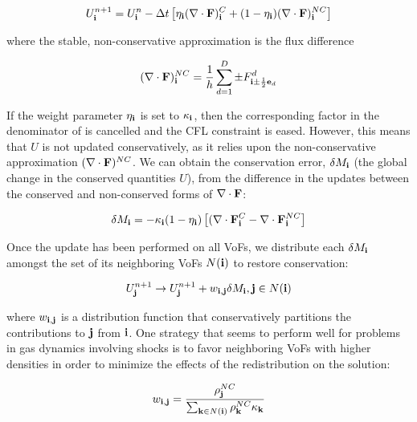 \begin{equation}
U^{n+1}_{\bf i} = U^n_{\bf i} - \Delta t\left[\eta_{\bf i}(\nabla\cdot{\mathbf{F}})^C_{\bf i} +
                                 (1 - \eta_{\bf i})(\nabla\cdot{\mathbf{F}})^{NC}_{\bf i}\right] \label{eq:stableUpdate}
\end{equation}

\noindent
where the stable, non-conservative approximation is the flux difference

\begin{equation}
(\nabla\cdot{\mathbf{F}})^{NC}_{\bf i} = \frac{1}{h}\sum_{d=1}^D\pm F^d_{{\bf i}\pm\frac{1}{2}{\bf e}_d} \label{eq:nonconservativeDivF}
\end{equation}

If the weight parameter $\eta_{\bf i}$ is set to $\kappa_{\bf i}$, then the 
corresponding factor in the denominator of  is 
cancelled and the CFL constraint is eased. However, this means that $U$ is 
not updated conservatively, as it relies upon the non-conservative 
approximation $(\nabla\cdot{\mathbf{F}})^{NC}$. We can obtain the conservation error, 
$\delta M_{\bf i}$ (the global change in the conserved quantities $U$), from the 
difference in the updates between the conserved and non-conserved forms of 
$\nabla\cdot{\mathbf{F}}$:

\begin{equation}
\delta M_{\bf i} = -\kappa_{\bf i}(1 - \eta_{\bf i})\left[(\nabla\cdot{\mathbf{F}}^C_{\bf i} - \nabla\cdot{\mathbf{F}}^{NC}_{\bf i}\right]
\end{equation}

\noindent
Once the update has been performed on all VoFs, we distribute each $\delta M_{\bf i}$ 
amongst the set of its neighboring VoFs $N({\bf i})$ to restore conservation:

\begin{eqnarray}
U^{n+1}_{\bf j} \rightarrow U^{n+1}_{\bf j} + w_{{\bf i},{\bf j}}\delta M_{\bf i}, {\bf j}\in N({\bf i})
\end{eqnarray}

\noindent
where $w_{{\bf i},{\bf j}}$ is a distribution function that conservatively partitions 
the contributions to ${\bf j}$ from ${\bf i}$. One strategy that seems to 
perform well for problems in gas dynamics involving shocks is to favor 
neighboring VoFs with higher densities in order to minimize the effects of the 
redistribution on the solution:

\begin{equation}
w_{{\bf i}, {\bf j}} = \frac{\rho_{\bf j}^{NC}}{\sum_{{\bf k}\in N({\bf i})}\rho_{\bf k}^{NC}\kappa_{\bf k}}
\end{equation}

